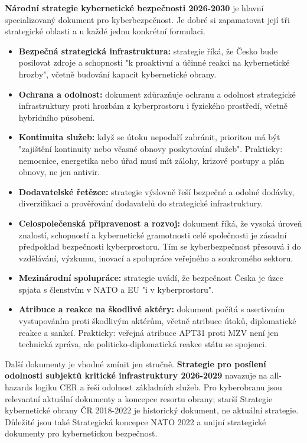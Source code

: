 \documentclass[11pt,a4paper]{article}
\begin{document}
\textbf{Národní strategie kybernetické bezpečnosti 2026-2030} je hlavní specializovaný dokument pro kyberbezpečnost. Je dobré si zapamatovat její tři strategické oblasti a u každé jednu konkrétní formulaci.
\begin{itemize}
  \item \textbf{Bezpečná strategická infrastruktura:} strategie říká, že Česko bude posilovat zdroje a schopnosti "k proaktivní a účinné reakci na kybernetické hrozby", včetně budování kapacit kybernetické obrany.
  \item \textbf{Ochrana a odolnost:} dokument zdůrazňuje ochranu a odolnost strategické infrastruktury proti hrozbám z kyberprostoru i fyzického prostředí, včetně hybridního působení.
  \item \textbf{Kontinuita služeb:} když se útoku nepodaří zabránit, prioritou má být "zajištění kontinuity nebo včasné obnovy poskytování služeb". Prakticky: nemocnice, energetika nebo úřad musí mít zálohy, krizové postupy a plán obnovy, ne jen antivir.
  \item \textbf{Dodavatelské řetězce:} strategie výslovně řeší bezpečné a odolné dodávky, diverzifikaci a prověřování dodavatelů do strategické infrastruktury.
  \item \textbf{Celospolečenská připravenost a rozvoj:} dokument říká, že vysoká úroveň znalostí, schopností a kybernetické gramotnosti celé společnosti je zásadní předpoklad bezpečnosti kyberprostoru. Tím se kyberbezpečnost přesouvá i do vzdělávání, výzkumu, inovací a spolupráce veřejného a soukromého sektoru.
  \item \textbf{Mezinárodní spolupráce:} strategie uvádí, že bezpečnost Česka je úzce spjata s členstvím v NATO a EU "i v kyberprostoru".
  \item \textbf{Atribuce a reakce na škodlivé aktéry:} dokument počítá s asertivním vystupováním proti škodlivým aktérům, včetně atribuce útoků, diplomatické reakce a sankcí. Prakticky: veřejná atribuce APT31 proti MZV není jen technická zpráva, ale politicko-diplomatická reakce státu se spojenci.
\end{itemize}

Další dokumenty je vhodné zmínit jen stručně. \textbf{Strategie pro posílení odolnosti subjektů kritické infrastruktury 2026-2029} navazuje na all-hazards logiku CER a řeší odolnost základních služeb. Pro kyberobranu jsou relevantní aktuální dokumenty a koncepce resortu obrany; starší Strategie kybernetické obrany ČR 2018-2022 je historický dokument, ne aktuální strategie. Důležité jsou také Strategická koncepce NATO 2022 a unijní strategické dokumenty pro kybernetickou bezpečnost.
\end{document}
